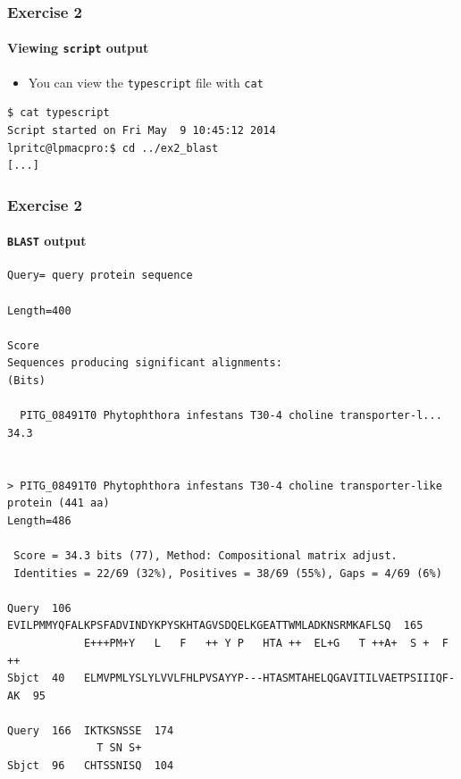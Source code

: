 \documentclass[table]{beamer}
\begin{document}
  \begin{frame}[fragile]
    \frametitle{Exercise 2}
    \framesubtitle{Viewing \texttt{script} output}
    \begin{itemize}
      \item You can view the \texttt{typescript} file with \texttt{cat}
    \end{itemize}
    \begin{lstlisting}[language=bash]
$ cat typescript
Script started on Fri May  9 10:45:12 2014
lpritc@lpmacpro:$ cd ../ex2_blast
[...]
    \end{lstlisting}    
\end{frame}

  \begin{frame}[fragile]
    \frametitle{Exercise 2}
    \framesubtitle{\texttt{BLAST} output}
    \begin{tiny}
    \begin{verbatim}
Query= query protein sequence

Length=400
                                                                      Score
Sequences producing significant alignments:                          (Bits)

  PITG_08491T0 Phytophthora infestans T30-4 choline transporter-l...  34.3


> PITG_08491T0 Phytophthora infestans T30-4 choline transporter-like 
protein (441 aa)
Length=486

 Score = 34.3 bits (77), Method: Compositional matrix adjust.
 Identities = 22/69 (32%), Positives = 38/69 (55%), Gaps = 4/69 (6%)

Query  106  EVILPMMYQFALKPSFADVINDYKPYSKHTAGVSDQELKGEATTWMLADKNSRMKAFLSQ  165
            E+++PM+Y   L   F   ++ Y P   HTA ++  EL+G   T ++A+  S +  F ++
Sbjct  40   ELMVPMLYSLYLVVLFHLPVSAYYP---HTASMTAHELQGAVITILVAETPSIIIQF-AK  95

Query  166  IKTKSNSSE  174
              T SN S+
Sbjct  96   CHTSSNISQ  104
    \end{verbatim}   
    \end{tiny} 
\end{frame}
\end{document}
